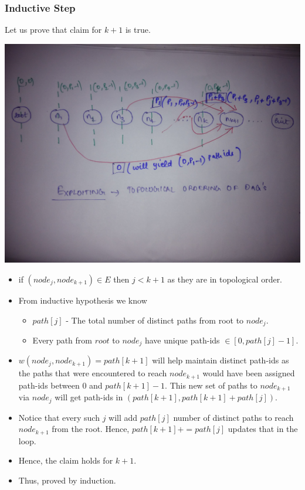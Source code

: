 \documentclass{article}
\begin{document}
\subsubsection{Inductive Step}
Let us prove that claim for $ k+1 $ is true.
\begin{center}
\includegraphics[scale=0.09]{3.jpg}
\end{center}
\begin{itemize}
\item if $(node_j, node_{k+1}) \in E$ then $j<k+1$ as they are in topological order. 
\item From inductive hypothesis we know 
\begin{itemize}
\item $path[j]$ - The total number of distinct paths from root to $node_j$.
\item Every path from $root$ to $node_j$ have unique path-ids $\in [0,path[j]-1]$.
\end{itemize}
\item $w(node_j, node_{k+1}) = path[k+1]$ will help maintain distinct path-ids as the paths that were encountered to reach $node_{k+1}$ would have been assigned path-ids between $0$ and $path[k+1]-1$. This new set of paths to $node_{k+1}$ via $node_{j}$ will get path-ids in $(path[k+1], path[k+1] +path[j])$.
\item Notice that every such $j$ will add $path[j]$ number of distinct paths to reach $node_{k+1}$ from the root. Hence, $path[k+1] += path[j]$ updates that in the loop.
\item Hence, the claim holds for $k+1$.
\item Thus, proved by induction.
\end{itemize}
\end{document}
